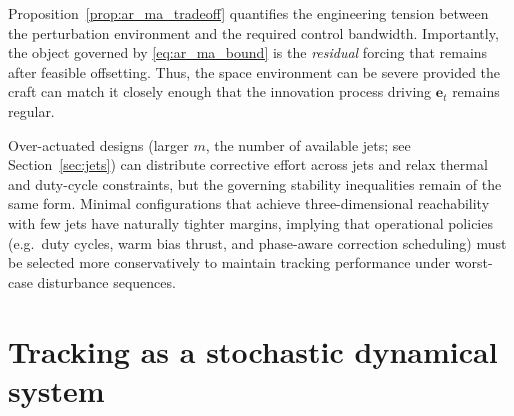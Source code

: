\documentclass{article}
\begin{document}
Proposition~\ref{prop:ar_ma_tradeoff} quantifies the engineering tension between the perturbation
environment and the required control bandwidth. Importantly, the object governed by
\eqref{eq:ar_ma_bound} is the \emph{residual} forcing that remains after feasible offsetting.
Thus, the space environment can be severe provided the craft can match it closely enough that the
innovation process driving $\mathbf{e}_t$ remains regular.

Over-actuated designs (larger $m$, the number of available jets; see Section~\ref{sec:jets}) can distribute corrective effort across jets and relax thermal and duty-cycle constraints, but the governing stability inequalities remain of the same form. Minimal configurations that achieve three-dimensional reachability with few jets have naturally tighter margins, implying that operational policies (e.g.\ duty cycles, warm bias thrust, and phase-aware correction scheduling) must be selected more conservatively to maintain tracking performance under worst-case disturbance sequences.



\section{Tracking as a stochastic dynamical system}
\label{sec:tracking}
\end{document}

